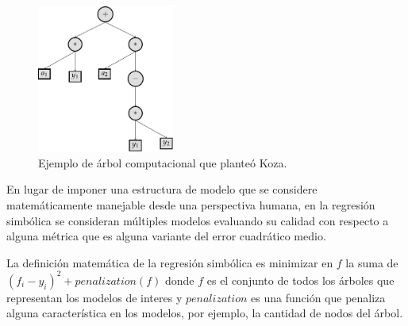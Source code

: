 \begin{center}
    \begin{figure}[h]
        \centering
        \includegraphics[width=0.4\textwidth]{"figures/koza_tree_example.pdf"}
        \caption{Ejemplo de árbol computacional que planteó Koza.}
        \label{tikzpicture:koza_tree_example}
    \end{figure}
\end{center}

En lugar de imponer una estructura de modelo que se considere matemáticamente manejable desde una perspectiva humana, en la regresión simbólica se consideran múltiples modelos evaluando su calidad con respecto a alguna métrica que es alguna variante del error cuadrático medio.

La definición matemática de la regresión simbólica es minimizar en $f$ la suma de $(f_i - y_i)^2 + penalization(f)$ donde $f$ es el conjunto de todos los árboles que representan los modelos de interes y $penalization$ es una función que penaliza alguna característica en los modelos, por ejemplo, la cantidad de nodos del árbol.



